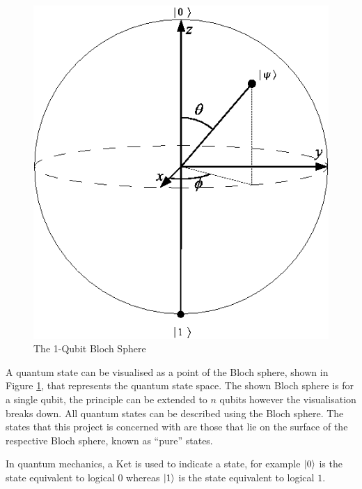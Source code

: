 \begin{figure}
\centering
\includegraphics[scale=0.5]{Bloch.png}
\caption{The 1-Qubit Bloch Sphere \cite{QuantikiBlochSphereImage}}
\label{BlochSphere}
\end{figure}

A quantum state can be visualised as a point of the Bloch sphere, shown in Figure \ref{BlochSphere}, that represents the quantum state space.
The shown Bloch sphere is for a single qubit, the principle can be extended to $n$ qubits however the visualisation breaks down.
All quantum states can be described using the Bloch sphere.
The states that this project is concerned with are those that lie on the surface of the respective Bloch sphere, known as ``pure'' states.

In quantum mechanics, a Ket is used to indicate a state, for example $\left\vert{0}\right\rangle$ is the state equivalent to logical $0$ whereas $\left\vert{1}\right\rangle$ is the state equivalent to logical $1$.

